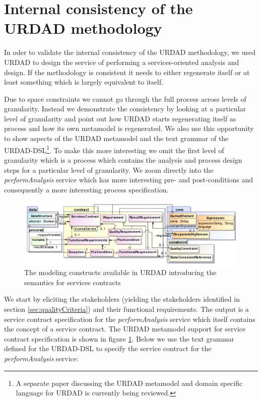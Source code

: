 \section{Internal consistency of the URDAD methodology}
\label{sec:urdadConsistency}

In oder to validate the internal consistency of the URDAD methodology, we used URDAD to design the service of performing a services-oriented analysis and design. If the methodology is consistent it needs to either regenerate itself or at least something which is largely equivalent to itself. 

Due to space constraints we cannot go through the full process across levels of granularity. Instead we demonstrate the consistency by looking at a particular level of granularity and point out how URDAD starts regenerating itself as process and how its own metamodel is regenerated. We also use this opportunity to show aspects of the URDAD metamodel and the text grammar of the URDAD-DSL\footnote{A separate paper discussing the URDAD metamodel and domain specific language for URDAD is currently being reviewed.}. To make this more interesting we omit the first level of granularity which is a process which contains the analysis and process design steps for a particular level of granularity. We zoom directly into the \emph{performAnalysis} service which has more interesting pre- and post-conditions and consequently a more interesting process specification.

\begin{figure}[Htbp]
  \centering
  \includegraphics{contract}
  \caption{The modeling constructs available in URDAD introducing the semantics for services contracts}
  \label{fig:contractModule}
\end{figure}

We start by eliciting the stakeholders (yielding the stakeholders identified in section \ref{sec:qualityCriteria}) and their functional requirements. The output is a service contract specification for the \emph{performAnalysis} service which itself contains the concept of a service contract. The URDAD metamodel support for service contract specification is shown in figure \ref{fig:contractModule}. Below we use the text grammar defined for the URDAD-DSL to specify the service contract for the \emph{performAnalysis} service:

